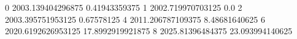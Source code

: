 0 2003.139404296875 0.41943359375
1 2002.719970703125 0.0
2 2003.395751953125 0.67578125
4 2011.206787109375 8.48681640625
6 2020.6192626953125 17.8992919921875
8 2025.81396484375 23.093994140625
